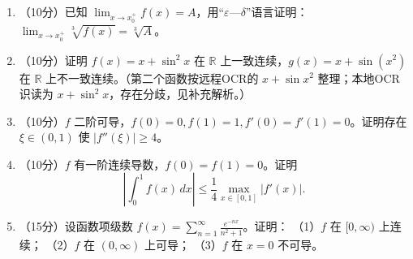 \documentclass[11pt,fontset=fandol]{ctexart}
\begin{document}
\begin{enumerate}
\def\labelenumi{\arabic{enumi}.}
\item
  （10分）已知
  \(\displaystyle\lim_{x\to x_0^+}f(x)=A\)，用``\(\varepsilon\)---\(\delta\)''语言证明：\(\displaystyle\lim_{x\to x_0^+}\sqrt[3]{f(x)}=\sqrt[3]A\)。
\item
  （10分）证明 \(f(x)=x+\sin^2x\) 在 \(\mathbb R\)
  上一致连续，\(g(x)=x+\sin(x^2)\) 在 \(\mathbb R\)
  上不一致连续。（第二个函数按远程OCR的 \(x+\sin x^2\)
  整理；本地OCR识读为 \(x+\sin^2x\)，存在分歧，见补充解析。）
\item
  （10分）\(f\) 二阶可导，\(f(0)=0,f(1)=1,f'(0)=f'(1)=0\)。证明存在
  \(\xi\in(0,1)\) 使 \(|f''(\xi)|\ge4\)。
\item
  （10分）\(f\) 有一阶连续导数，\(f(0)=f(1)=0\)。证明 \[
  \left|\int_0^1f(x)\,dx\right|\le\frac14\max_{x\in[0,1]}|f'(x)|.
  \]
\item
  （15分）设函数项级数
  \(\displaystyle f(x)=\sum_{n=1}^\infty\frac{e^{-nx}}{n^2+1}\)。证明：
  （1）\(f\) 在 \([0,\infty)\) 上连续； （2）\(f\) 在 \((0,\infty)\)
  上可导； （3）\(f\) 在 \(x=0\) 不可导。
\end{enumerate}
\end{document}
